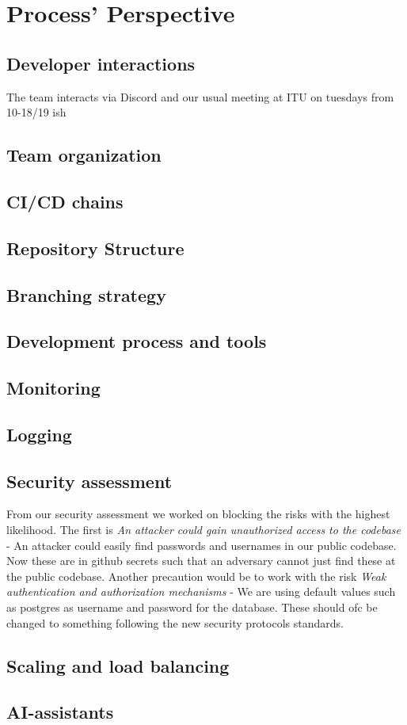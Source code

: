 \section{Process' Perspective}

\subsection{Developer interactions}
The team interacts via Discord and our usual meeting at ITU on tuesdays from 10-18/19 ish

\subsection{Team organization}

\subsection{CI/CD chains}

\subsection{Repository Structure}

\subsection{Branching strategy}

\subsection{Development process and tools}

\subsection{Monitoring}

\subsection{Logging}

\subsection{Security assessment}
From our security assessment we worked on blocking the risks with the highest likelihood. The first is \textit{An attacker could gain unauthorized access to the codebase}
- An attacker could easily find passwords and usernames in our public codebase. Now these are in github secrets such that an adversary cannot just 
find these at the public codebase. Another precaution would be to work with the risk \textit{Weak authentication and authorization mechanisms}
 - We are using default values such as postgres as username and password for the database. These should ofc be changed to something following the
 new security protocols standards. 

 \subsection{Scaling and load balancing}

 \subsection{AI-assistants}